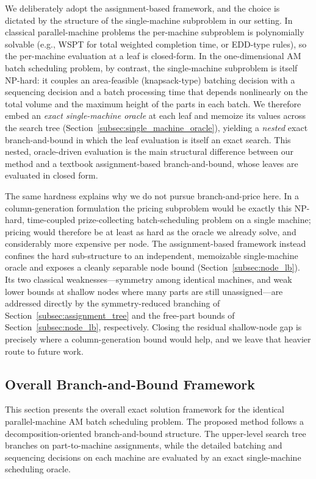 \documentclass[letterpaper, 10 pt, conference]{ieeeconf}  %
\begin{document}
We deliberately adopt the assignment-based framework, and the choice is dictated
by the structure of the single-machine subproblem in our setting. In classical
parallel-machine problems the per-machine subproblem is polynomially solvable
(e.g., WSPT for total weighted completion time, or EDD-type rules), so the
per-machine evaluation at a leaf is closed-form. In the one-dimensional AM batch
scheduling problem, by contrast, the single-machine subproblem is itself
NP-hard: it couples an area-feasible (knapsack-type) batching decision with a
sequencing decision and a batch processing time that depends nonlinearly on the
total volume and the maximum height of the parts in each batch. We therefore
embed an \emph{exact single-machine oracle} at each leaf and memoize its values
across the search tree (Section~\ref{subsec:single_machine_oracle}), yielding a
\emph{nested} exact branch-and-bound in which the leaf evaluation is itself an
exact search. This nested, oracle-driven evaluation is the main structural
difference between our method and a textbook assignment-based branch-and-bound,
whose leaves are evaluated in closed form.

The same hardness explains why we do not pursue branch-and-price here. In a
column-generation formulation the pricing subproblem would be exactly this
NP-hard, time-coupled prize-collecting batch-scheduling problem on a single
machine; pricing would therefore be at least as hard as the oracle we already
solve, and considerably more expensive per node. The assignment-based framework
instead confines the hard sub-structure to an independent, memoizable
single-machine oracle and exposes a cleanly separable node bound
(Section~\ref{subsec:node_lb}). Its two classical weaknesses---symmetry among
identical machines, and weak lower bounds at shallow nodes where many parts are
still unassigned---are addressed directly by the symmetry-reduced branching of
Section~\ref{subsec:assignment_tree} and the free-part bounds of
Section~\ref{subsec:node_lb}, respectively. Closing the residual shallow-node gap
is precisely where a column-generation bound would help, and we leave that
heavier route to future work.

\subsection{Overall Branch-and-Bound Framework}
\label{subsec:overall_framework}

This section presents the overall exact solution framework for the identical
parallel-machine AM batch scheduling problem. The proposed method follows a
decomposition-oriented branch-and-bound structure. The upper-level search
tree branches on part-to-machine assignments, while the detailed batching
and sequencing decisions on each machine are evaluated by an exact
single-machine scheduling oracle.
\end{document}
